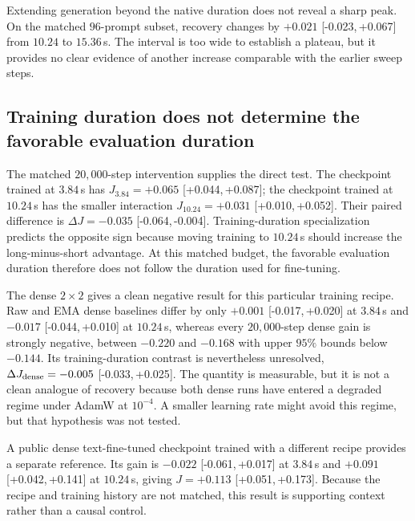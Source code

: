 \documentclass{article}
\newcommand{\ci}[2]{[{#1},\,{#2}]}
\begin{document}
Extending generation beyond the native duration does not reveal a sharp peak. On the matched $96$-prompt subset, recovery changes by $+0.021$ \ci{-0.023}{+0.067} from $10.24$ to $15.36$\,s. The interval is too wide to establish a plateau, but it provides no clear evidence of another increase comparable with the earlier sweep steps.

\subsection{Training duration does not determine the favorable evaluation duration}
The matched $20{,}000$-step intervention supplies the direct test. The checkpoint trained at $3.84$\,s has $J_{3.84}=+0.065$ \ci{+0.044}{+0.087}; the checkpoint trained at $10.24$\,s has the smaller interaction $J_{10.24}=+0.031$ \ci{+0.010}{+0.052}. Their paired difference is $\Delta J=-0.035$ \ci{-0.064}{-0.004}. Training-duration specialization predicts the opposite sign because moving training to $10.24$\,s should increase the long-minus-short advantage. At this matched budget, the favorable evaluation duration therefore does not follow the duration used for fine-tuning.

The dense $2\times2$ gives a clean negative result for this particular training recipe. Raw and EMA dense baselines differ by only $+0.001$ \ci{-0.017}{+0.020} at $3.84$\,s and $-0.017$ \ci{-0.044}{+0.010} at $10.24$\,s, whereas every $20{,}000$-step dense gain is strongly negative, between $-0.220$ and $-0.168$ with upper $95\%$ bounds below $-0.144$. Its training-duration contrast is nevertheless unresolved, $\Delta J_{\rm dense}=-0.005$ \ci{-0.033}{+0.025}. The quantity is measurable, but it is not a clean analogue of recovery because both dense runs have entered a degraded regime under AdamW at $10^{-4}$. A smaller learning rate might avoid this regime, but that hypothesis was not tested.

A public dense text-fine-tuned checkpoint trained with a different recipe provides a separate reference. Its gain is $-0.022$ \ci{-0.061}{+0.017} at $3.84$\,s and $+0.091$ \ci{+0.042}{+0.141} at $10.24$\,s, giving $J=+0.113$ \ci{+0.051}{+0.173}. Because the recipe and training history are not matched, this result is supporting context rather than a causal control.
\end{document}
